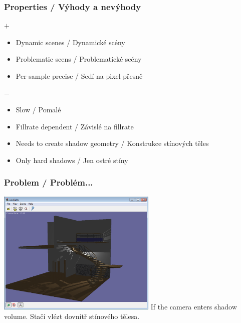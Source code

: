 \begin{frame}\frametitle{Properties / Výhody a nevýhody}
$+$
\begin{itemize}
  \item Dynamic scenes / Dynamické scény
  \item Problematic scens / Problematické scény
  \item Per-sample precise / Sedí na pixel přesně
\end{itemize}

\vfill
$-$
\begin{itemize}
    \item Slow / Pomalé
    \item Fillrate dependent / Závislé na fillrate
    \item Needs to create shadow geometry / Konstrukce stínových těles
    \item Only hard shadows / Jen ostré stíny
\end{itemize}
\end{frame}

\begin{frame}\frametitle{Problem / Problém...}
\includegraphics[width=3in]{pics/shadows/shadowVolumes/ZPass-fail.eps}
\pause\vfill
If the camera enters shadow volume.
Stačí vlézt dovnitř stínového tělesa.
\end{frame}

